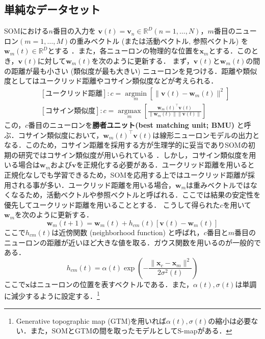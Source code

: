 \subsection{単純なデータセット}
SOMにおける$n$番目の入力を $\mathbf{v}(t)=\mathbf{v}_n\in \mathbb{R}^{D} (n=1, \ldots, N)$，$m$番目のニューロン$ (m=1, \ldots, M) $の重みベクトル (または活動ベクトル, 参照ベクトル) を$\mathbf{w}_m(t)\in \mathbb{R}^{D}$とする \citep{Kohonen2013-yt}．また，各ニューロンの物理的な位置を$\mathbf{x}_m$とする．このとき，$\mathbf{v}(t)$に対して$\mathbf{w}_m(t)$を次のように更新する．
まず，$\mathbf{v}(t)$と$\mathbf{w}_m(t)$の間の距離が最も小さい (類似度が最も大きい) ニューロンを見つける．距離や類似度としてはユークリッド距離やコサイン類似度などが考えられる．
\begin{align}
&[\text{ユークリッド距離}]: c = \underset{m}{\operatorname{argmin}}\left[\|\mathbf{v}(t)-\mathbf{w}_m(t)\|^2\right]\\
&[\text{コサイン類似度}]: c  = \underset{m}{\operatorname{argmax}}\left[\frac{\mathbf{w}_m(t)^\top\mathbf{v}(t)}{\|\mathbf{w}_m(t)\|\|\mathbf{v}(t)\|}\right]
\end{align}
この，$c$番目のニューロンを\textbf{勝者ユニット(best matching unit; BMU)} と呼ぶ．コサイン類似度において，$\mathbf{w}_m(t)^\top\mathbf{v}(t)$は線形ニューロンモデルの出力となる．このため，コサイン距離を採用する方が生理学的に妥当でありSOMの初期の研究ではコサイン類似度が用いられている \citep{Kohonen1982-mn}．しかし，コサイン類似度を用いる場合は$\mathbf{w}_m$および$\mathbf{v}$を正規化する必要がある．ユークリッド距離を用いると正規化なしでも学習できるため，SOMを応用する上ではユークリッド距離が採用される事が多い．ユークリッド距離を用いる場合，$\mathbf{w}_m$は重みベクトルではなくなるため，活動ベクトルや参照ベクトルと呼ばれる．ここでは結果の安定性を優先してユークリッド距離を用いることとする．
こうして得られた$c$を用いて$\mathbf{w}_m$を次のように更新する．
\begin{equation}
\mathbf{w}_m(t+1)=\mathbf{w}_m(t)+h_{cm}(t)[\mathbf{v}(t)-\mathbf{w}_m(t)]
\end{equation}
ここで$h_{cm}(t)$は近傍関数 (neighborhood function) と呼ばれ，$c$番目と$m$番目のニューロンの距離が近いほど大きな値を取る．ガウス関数を用いるのが一般的である．
\begin{equation}
h_{cm}(t)=\alpha(t)\exp\left(-\frac{\|\mathbf{x}_c-\mathbf{x}_m\|^2}{2\sigma^2(t)}\right)
\end{equation}
ここで$\mathbf{x}$はニューロンの位置を表すベクトルである．また，$\alpha(t), \sigma(t)$は単調に減少するように設定する．\footnote{Generative topographic map (GTM)を用いれば$\alpha(t), \sigma(t)$の縮小は必要ない．また，SOMとGTMの間を取ったモデルとしてS-mapがある．}
